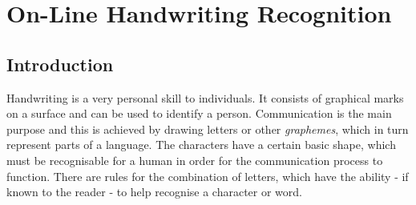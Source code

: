 ﻿%

\chapter{On-Line Handwriting Recognition}
\label{chap:onlinehwr}



\section{Introduction}
\label{sec:onlinehwrintroduction}




Handwriting is a very personal skill to individuals. It consists of graphical
marks on a surface and can be used to identify a person. 
Communication is the main purpose and this is achieved by drawing letters or other 
\emph{graphemes}, which in turn represent parts of a language.
The characters have a certain basic shape, which must be recognisable
for a human in order for the communication process to function.
There are rules for the combination of letters, which have the ability - if
known to the reader - to help recognise a character or word.

